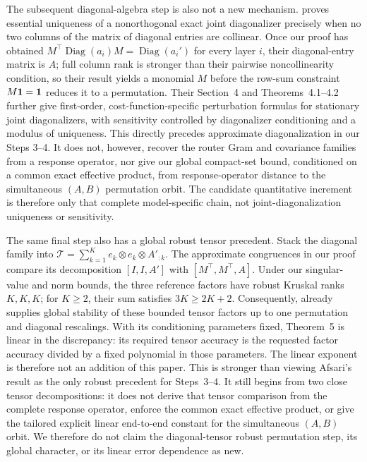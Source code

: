 The subsequent diagonal-algebra step is also not a new mechanism.
\citet[Theorem~2.3]{afsari2008sensitivity} proves essential uniqueness of a
nonorthogonal exact joint diagonalizer precisely when no two columns of the
matrix of diagonal entries are collinear.  Once our proof has obtained
\(M^\top\operatorname{Diag}(a_i)M=\operatorname{Diag}(a_i')\) for every
layer \(i\), their diagonal-entry matrix is \(A\); full column rank is stronger
than their pairwise noncollinearity condition, so their result yields a
monomial \(M\) before the row-sum constraint \(M\mathbf{1}=\mathbf{1}\) reduces it to a
permutation.  Their Section~4 and Theorems~4.1--4.2 further give first-order,
cost-function-specific perturbation formulas for stationary joint
diagonalizers, with sensitivity controlled by diagonalizer conditioning and a
modulus of uniqueness.  This directly precedes approximate diagonalization in
our Steps 3--4.  It does not, however, recover the router Gram and covariance
families from a response operator, nor give our global compact-set bound,
conditioned on a common exact effective product, from response-operator
distance to the simultaneous \((A,B)\) permutation orbit.  The candidate
quantitative increment is therefore only that complete
model-specific chain, not joint-diagonalization uniqueness or sensitivity.

The same final step also has a global robust tensor precedent.  Stack the
diagonal family into
\(\mathcal T=\sum_{k=1}^K e_k\otimes e_k\otimes A'_{:k}\).  The approximate
congruences in our proof compare its decomposition \([I,I,A']\) with
\([M^\top,M^\top,A]\).  Under our singular-value and norm bounds, the three
reference factors have robust Kruskal ranks \(K,K,K\); for \(K\ge2\), their
sum satisfies \(3K\ge2K+2\).  Consequently,
\citet[Theorem~5]{bhaskara2014uniqueness} already supplies global stability of these bounded tensor factors up to
one permutation and diagonal rescalings. With its conditioning parameters
fixed, Theorem~5 is linear in the discrepancy: its required tensor accuracy
is the requested factor accuracy divided by a fixed polynomial in those
parameters. The linear exponent is therefore not an addition of this paper.  This is stronger than viewing Afsari's result as the only robust
precedent for Steps~3--4.  It still begins from two close tensor
decompositions: it does not derive that tensor comparison from the complete
response operator, enforce the common exact effective product, or give the
tailored explicit linear end-to-end constant for the simultaneous \((A,B)\)
orbit. We therefore do not claim the diagonal-tensor robust permutation
step, its global character, or its linear error dependence as new.

